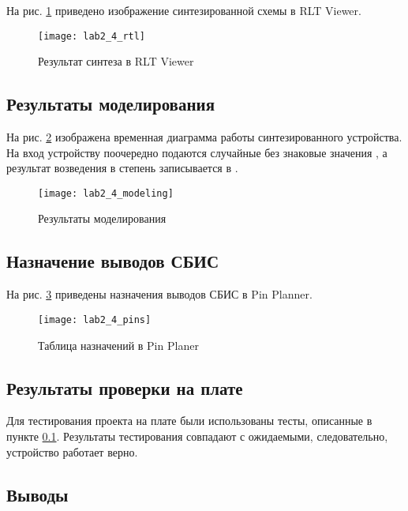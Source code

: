 На рис. \ref{fig:lab2_4_rtl} приведено изображение синтезированной схемы в RLT Viewer.

\begin{figure}[H]
\begin{center}
	\texttt{[image: lab2\_4\_rtl]}
	\caption{Результат синтеза в RLT Viewer}
	\label{fig:lab2_4_rtl}
\end{center}
\end{figure}

\subsection{Результаты моделирования}
\label{sec:lab2_4_modeling}

На рис. \ref{fig:lab2_4_modeling} изображена временная диаграмма работы синтезированного устройства. На вход устройству поочередно подаются случайные без знаковые значения , а результат возведения в степень записывается в .
\begin{figure}[H]
\begin{center}
	\texttt{[image: lab2\_4\_modeling]}
	\caption{Результаты моделирования}
	\label{fig:lab2_4_modeling}
\end{center}
\end{figure}

\subsection{Назначение выводов СБИС}

На рис. \ref{fig:lab2_4_pins} приведены назначения выводов СБИС в Pin Planner.

\begin{figure}[H]
\begin{center}
	\texttt{[image: lab2\_4\_pins]}
	\caption{Таблица назначений в Pin Planer}
	\label{fig:lab2_4_pins}
\end{center}
\end{figure}

\subsection{Результаты проверки на плате}

Для тестирования проекта на плате были использованы тесты, описанные в пункте \ref{sec:lab2_4_modeling}. Результаты тестирования совпадают с ожидаемыми, следовательно, устройство работает верно.

\subsection{Выводы}

